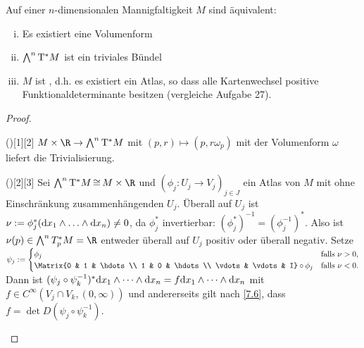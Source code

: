 \begin{st} \label{7.5a} %
    Auf einer $n$-dimensionalen Mannigfaltigkeit $M$ sind äquivalent:
    \begin{enumerate}[(i)]
        \item
            Es existiert eine Volumenform
        \item
            $\bigwedge^n \mathrm{T}^* M$ ist ein triviales Bündel
        \item
            $M$ ist , d.h. es existiert ein Atlas, so dass alle Kartenwechsel positive Funktionaldeterminante besitzen (vergleiche Aufgabe 27).
    \end{enumerate}
    \begin{proof}
        \begin{seg}{\ProofImplication()[1][2]}
            $M \times \R \to \bigwedge^n \T^* M$ mit $(p,r) \mapsto (p, r \omega_p)$ mit der Volumenform $\omega$ liefert die Trivialisierung.
        \end{seg}
        \begin{seg}{\ProofImplication()[2][3]}
            Sei $\bigwedge^n \T^* M \diffeomorphic M \times \R$ und $(\phi_j: U_j \to V_j)_{j \in J}$ ein Atlas von $M$ mit ohne Einschränkung zusammenhängenden $U_j$.
            Überall auf $U_j$ ist $\nu := \phi_j^* (\mathrm{d} x_1 \wedge \dotsc \wedge \mathrm{d} x_n) \neq 0$, da $\phi_j^*$ invertierbar: $(\phi_j^*)^{-1} = (\phi_j^{-1})^*$.
            Also ist $\nu(p) \in \bigwedge^n T_p^* M = \R$ entweder überall auf $U_j$ positiv oder überall negativ.
            Setze
            \begin{math}
                \psi_j := \begin{cases}
                    \phi_j & \text{falls $\nu > 0$}, \\
                    \Matrix{0 & 1 & \hdots \\ 1 & 0 & \hdots \\ \vdots & \vdots & I} \circ \phi_j & \text{falls $\nu < 0$}.
                \end{cases}
            \end{math}
            Dann ist
            \begin{math}
                (\psi_j \circ \psi_k^{-1})^* \mathrm{d} x_1 \wedge \dotsb \wedge \mathrm{d} x_n
                = f \mathrm{d} x_1 \wedge \dotsb \wedge \mathrm{d} x_n
            \end{math}
            mit $f \in C^\infty(V_j \cap V_k, (0, \infty))$ und andererseits gilt nach \ref{7.6}, dass $f = \det D(\psi_j \circ \psi_k^{-1})$.
        \end{seg}

\end{proof}
\end{st}
